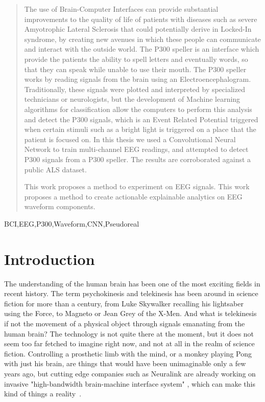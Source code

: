 \documentclass[conference]{IEEEtran}
\begin{document}
\begin{abstract}
The use of Brain-Computer Interfaces can provide substantial improvements to the quality of life of patients with diseases such as severe Amyotrophic Lateral Sclerosis that could potentially derive in Locked-In syndrome, by creating new avenues in which these people can communicate and interact with the outside world. The P300 speller is an interface which provide the patients the ability to spell letters and eventually words, so that they can speak while unable to use their mouth. The P300 speller works by reading signals from the brain using an Electroencephalogram. Traditionally, these signals were plotted and interpreted by specialized technicians or neurologists, but the development of Machine learning algorithms for classification allow the computers to perform this analysis and detect the P300 signals, which is an Event Related Potential triggered when certain stimuli such as a bright light is triggered on a place that the patient is focused on. In this thesis we used a Convolutional Neural Network to train multi-channel EEG readings, and attempted to detect P300 signals from a P300 speller. The results are corroborated against a public ALS dataset.


This work proposes a method to experiment on EEG signals.
This work proposes a method to create actionable explainable analytics on EEG waveform components.



\end{abstract}

\begin{IEEEkeywords}
BCI,EEG,P300,Waveform,CNN,Pseudoreal
\end{IEEEkeywords}

\section{Introduction}
\label{intro}

The understanding of the human brain has been one of the most exciting fields in recent history. The term psychokinesis and telekinesis has been around in science fiction for more than a century, from Luke Skywalker recalling his lightsaber using the Force, to Magneto  or Jean Grey of the X-Men. And what is telekinesis if not the movement of a physical object through signals emanating from the human brain?\cite{bcianiversary:10.1080/00051144.2019.1570644} The technology is not quite there at the moment, but it does not seem too far fetched to imagine right now, and not at all in the realm of science fiction. Controlling a prosthetic limb with the mind, or a monkey playing Pong\cite{neuralinkpong} with just his brain, are things that would have been unimaginable only a few years ago, but  cutting edge companies such as Neuralink are already working on invasive "high-bandwidth brain-machine interface system" \cite{info:neuralink/10.2196/16194}, which can make this kind of things a reality~\cite{Huggins.etal2022}.  
\end{document}
